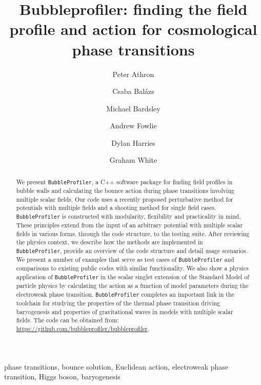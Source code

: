 \documentclass[final,3p,11pt,pdflatex]{elsarticle}
\makeatletter
\newcommand{\bpgitrepo}{%
  \url{https://github.com/bubbleprofiler/bubbleprofiler}\xspace}
\newcommand{\bphomepage}{\bpgitrepo}
\newcommand{\bp}{\texttt{BubbleProfiler}\@\xspace}
\makeatother
\begin{document}
\begin{frontmatter}
 \vspace*{0.5cm}
 \title{\Large\bf Bubbleprofiler: finding the field profile and action for cosmological  phase transitions}

\author[Monash]{Peter Athron}
\author[Monash]{Csaba Bal\'azs}
\author[Monash]{Michael Bardsley}
\author[Monash,Nanjing]{Andrew Fowlie}
\author[adelaide,prague]{Dylan Harries}
\author[Monash,Triumf]{Graham White}
\address[Monash]{ARC Centre of Excellence for Particle Physics at
  the Terascale, School of Physics, Monash University, Melbourne,
  Victoria 3800, Australia}
\address[Nanjing]{Department of Physics and Institute of Theoretical Physics, Nanjing Normal University, Nanjing, Jiangsu 210023, China}
\address[adelaide]{ARC Centre of Excellence for Particle Physics at
the Terascale, Department of Physics, The University of Adelaide,
Adelaide, South Australia 5005, Australia}
\address[prague]{Institute of Particle and Nuclear Physics, Faculty of
  Mathematics and Physics, Charles University in Prague, V
  Hole\v{s}ovi\v{c}k\'{a}ch 2, 180 00 Praha 8, Czech Republic}
\address[Triumf]{TRIUMF, 4004 Wesbrook Mall, Vancouver, British Columbia V6T 2A3, Canada}

  \begin{abstract}
    We present \bp, a C++ software package for finding field profiles in bubble walls and calculating the bounce action during phase transitions involving multiple scalar fields.
%
    Our code uses a recently proposed perturbative method for potentials with multiple fields and a shooting method for single field cases.
%
    \bp is constructed with modularity, flexibility and practicality in mind.
%
    These principles extend from the input of an arbitrary potential with multiple scalar fields in various forms, through the code structure, to the testing suite.
%
    \noindent After reviewing the physics context, we describe how the methods are implemented in \bp, provide an overview of the code structure and detail usage scenarios.
%
    We present a number of examples that serve as test cases of \bp and comparisons to existing public codes with similar functionality.
%
    We also show a physics application of \bp in the scalar singlet extension of the Standard Model of particle physics by calculating the action as a function of model parameters during the electroweak phase transition.
%
    \bp completes an important link in the toolchain for studying the properties of the thermal phase transition driving baryogenesis and properties of gravitational waves in models with multiple scalar fields.
%
    The code can be obtained from: \bphomepage.
  \end{abstract}

\begin{keyword}
phase transitions,
bounce solution,
Euclidean action, 
electroweak phase transition,
Higgs boson,
baryogenesis
\end{keyword}
\end{frontmatter}
\end{document}
